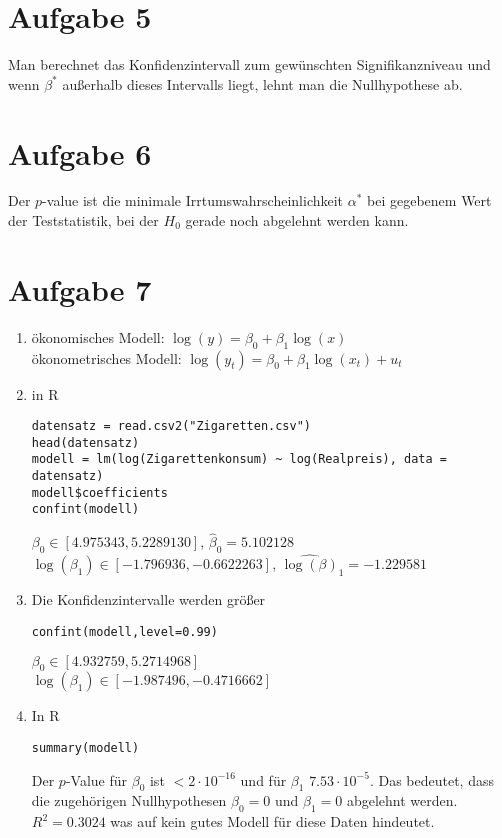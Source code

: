 \documentclass{article}
\begin{document}
	\section*{Aufgabe 5}
	Man berechnet das Konfidenzintervall zum gewünschten Signifikanzniveau und wenn $\beta^\ast$ außerhalb dieses Intervalls liegt, lehnt man die Nullhypothese ab.
	
	\section*{Aufgabe 6}
	Der $p$-value ist die minimale Irrtumswahrscheinlichkeit $\alpha^\ast$ bei gegebenem Wert der Teststatistik, bei der $H_0$ gerade noch abgelehnt werden kann.
	
	\section*{Aufgabe 7}
	\begin{enumerate}[label=(\alph*)]
		\item ökonomisches Modell: $\log(y) = \beta_0 + \beta_1\log(x)$ \\
		ökonometrisches Modell: $\log(y_t) = \beta_0 + \beta_1\log(x_t) + u_t$
		\item in R
		\begin{lstlisting}[style=R]
datensatz = read.csv2("Zigaretten.csv")
head(datensatz)
modell = lm(log(Zigarettenkonsum) ~ log(Realpreis), data = datensatz)
modell$coefficients
confint(modell)
		\end{lstlisting}
		$\beta_0\in [4.975343, 5.2289130]$, $\hat{\beta}_0=5.102128$ \\
		$\log(\beta_1)\in [-1.796936,-0.6622263]$, $\hat{\log(\beta)}_1=-1.229581$
		\item Die Konfidenzintervalle werden größer
		\begin{lstlisting}[style=R]
confint(modell,level=0.99)
		\end{lstlisting}
		$\beta_0\in [4.932759, 5.2714968]$ \\
		$\log(\beta_1)\in [-1.987496,-0.4716662]$
		\item In R
		\begin{lstlisting}[style=R]
summary(modell)
		\end{lstlisting}
		Der $p$-Value für $\beta_0$ ist $< 2\cdot 10^{-16}$ und für $\beta_1$ $7.53\cdot 10^{-5}$. Das bedeutet, dass die zugehörigen Nullhypothesen $\beta_0=0$ und $\beta_1=0$ abgelehnt werden. $R^2=0.3024$ was auf kein gutes Modell für diese Daten hindeutet.
	\end{enumerate}
\end{document}
